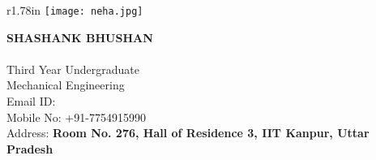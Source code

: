 \documentclass[letterpaper]{deedy-resume} %
\begin{document}

\begin{wrapfigure}{r}{1.78in}
\vspace{-0.36cm}
\centering
\texttt{[image: neha.jpg]}
\end{wrapfigure}

{\noindent\uppercase{\textbf{\LARGE{Shashank Bhushan}}}\\}
\\
\hspace{73pt}Third Year Undergraduate\\
\hspace{73pt}Mechanical Engineering \\
\hspace{73pt} Email ID:  \\
Mobile No: +91-7754915990\\
Address: \textbf{Room No. 276, Hall of Residence 3, IIT Kanpur, Uttar Pradesh}\\
\microspace
\noindent\makebox[\linewidth]{\color{headings}\rule{\paperwidth}{0.6pt}} %
\vspace{-5pt}
\end{document}
